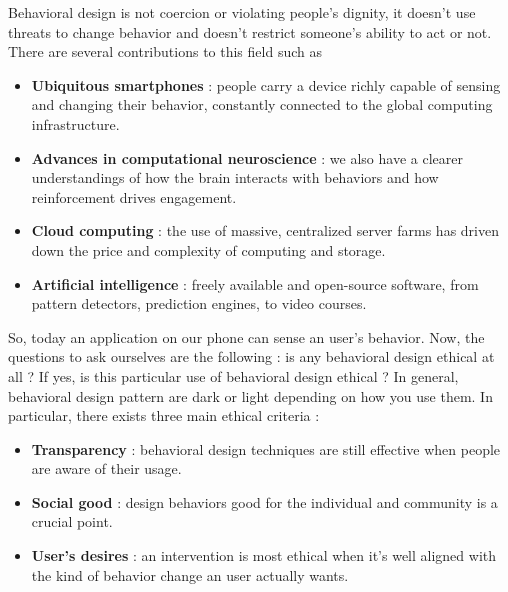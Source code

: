 \documentclass[11pt]{article}
\begin{document}
Behavioral design is not coercion or violating people's dignity, it doesn't use threats to change behavior and doesn't restrict someone's ability to act or not. There are several contributions to this field such as 

\begin{itemize}
\item \textbf{Ubiquitous smartphones} : people carry a device richly capable of sensing and changing their behavior, constantly connected to the global computing infrastructure.

\item \textbf{Advances in computational neuroscience} : we also have a clearer understandings of how the brain interacts with behaviors and how reinforcement drives engagement.

\item \textbf{Cloud computing} : the use of massive, centralized server farms has driven down the price and complexity of computing and storage.

\item \textbf{Artificial intelligence} : freely available and open-source software, from pattern detectors, prediction engines, to video courses.
\end{itemize}

So, today an application on our phone can sense an user's behavior. Now, the questions to ask ourselves are the following : is any behavioral design ethical at all ? If yes, is this particular use of behavioral design ethical ? In general, behavioral design pattern are dark or light depending on how you use them. In particular, there exists three main ethical criteria :

\begin{itemize}
\item \textbf{Transparency} : behavioral design techniques are still effective when people are aware of their usage.

\item \textbf{Social good} : design behaviors good for the individual and community is a crucial point.

\item \textbf{User's desires} : an intervention is most ethical when it's well aligned with the kind of behavior change an user actually wants.
\end{itemize}
\end{document}
